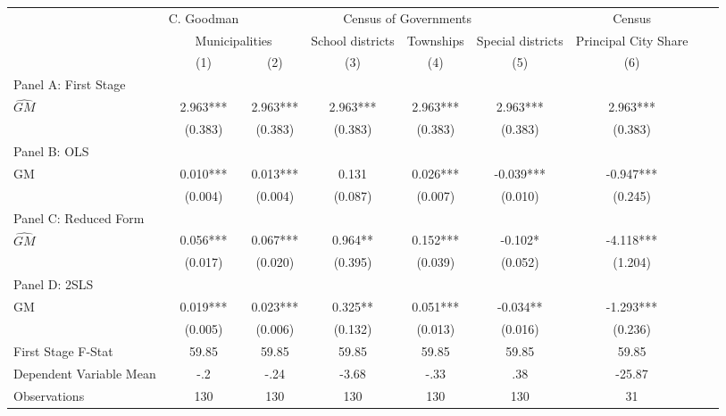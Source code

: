  \begin{tabular}{l*{8}{c}} \toprule
&\multicolumn{1}{c}{C. Goodman}&\multicolumn{4}{c}{Census of Governments}&\multicolumn{1}{c}{Census}\\\cmidrule(lr){2-2}\cmidrule(lr){3-6}\cmidrule(lr){7-7}
&\multicolumn{2}{c}{Municipalities}&\multicolumn{1}{c}{School districts}&\multicolumn{1}{c}{Townships}&\multicolumn{1}{c}{Special districts}&\multicolumn{1}{c}{Principal City Share}\\\cmidrule(lr){2-3}\cmidrule(lr){4-6}\cmidrule(lr){7-7}
&\multicolumn{1}{c}{(1)}&\multicolumn{1}{c}{(2)}&\multicolumn{1}{c}{(3)}&\multicolumn{1}{c}{(4)}&\multicolumn{1}{c}{(5)}&\multicolumn{1}{c}{(6)}\\
\cmidrule(lr){1-7}
\multicolumn{6}{l}{Panel A: First Stage}\\
\cmidrule(lr){1-7}
$\widehat{GM}$  &    2.963***&    2.963***&    2.963***&    2.963***&    2.963***&    2.963***\\
                &  (0.383)   &  (0.383)   &  (0.383)   &  (0.383)   &  (0.383)   &  (0.383)   \\
\cmidrule(lr){1-7}
\multicolumn{6}{l}{Panel B: OLS}\\
\cmidrule(lr){1-7}
GM              &    0.010***&    0.013***&    0.131   &    0.026***&   -0.039***&   -0.947***\\
                &  (0.004)   &  (0.004)   &  (0.087)   &  (0.007)   &  (0.010)   &  (0.245)   \\
\cmidrule(lr){1-7}
\multicolumn{6}{l}{Panel C: Reduced Form}\\
\cmidrule(lr){1-7}
$\widehat{GM}$  &    0.056***&    0.067***&    0.964** &    0.152***&   -0.102*  &   -4.118***\\
                &  (0.017)   &  (0.020)   &  (0.395)   &  (0.039)   &  (0.052)   &  (1.204)   \\
\cmidrule(lr){1-7}
\multicolumn{6}{l}{Panel D: 2SLS}\\
\cmidrule(lr){1-7}
GM              &    0.019***&    0.023***&    0.325** &    0.051***&   -0.034** &   -1.293***\\
                &  (0.005)   &  (0.006)   &  (0.132)   &  (0.013)   &  (0.016)   &  (0.236)   \\
\midrule
First Stage F-Stat&    59.85   &    59.85   &    59.85   &    59.85   &    59.85   &    59.85   \\
Dependent Variable Mean&      -.2   &     -.24   &    -3.68   &     -.33   &      .38   &   -25.87   \\
Observations    &      130   &      130   &      130   &      130   &      130   &       31   \\
       \bottomrule \end{tabular}
